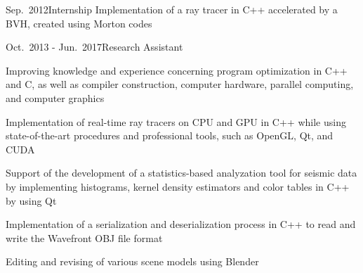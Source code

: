 \documentclass[a4paper,10pt]{cv}
\begin{document}
  \bigskip
      \begin{cvTimeItem}{Sep.~2012}{Internship}
        Implementation of a ray tracer in C++ accelerated by a BVH, created using Morton codes
      \end{cvTimeItem}
      \begin{cvTimeItem}{Oct.~2013 - Jun.~2017}{Research Assistant}
        \begin{cvItemize}
          \item Improving knowledge and experience concerning program optimization in C++ and C, as well as compiler construction, computer hardware, parallel computing, and computer graphics
          \item Implementation of real-time ray tracers on CPU and GPU in C++ while using state-of-the-art procedures and professional tools, such as OpenGL, Qt, and CUDA
          \item Support of the development of a statistics-based analyzation tool for seismic data by implementing histograms, kernel density estimators and color tables in C++ by using Qt
          \item Implementation of a serialization and deserialization process in C++ to read and write the Wavefront OBJ file format
          \item Editing and revising of various scene models using Blender
        \end{cvItemize}
      \end{cvTimeItem}
\end{document}
